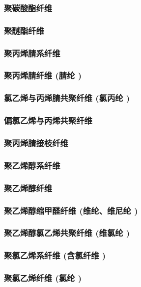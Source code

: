 \documentclass[UTF8]{../../ApplicationUniverse}
\begin{document}
        \subsubsection{聚碳酸酯纤维}
        \subsubsection{聚醚酯纤维}
    \subsubsection{聚丙烯腈系纤维}
        \subsubsection{聚丙烯腈纤维 (腈纶 )}
        \subsubsection{氯乙烯与丙烯腈共聚纤维 (氯丙纶 )}
        \subsubsection{偏氯乙烯与丙烯共聚纤维}
        \subsubsection{聚丙烯腈接枝纤维}
    \subsubsection{聚乙烯醇系纤维}
        \subsubsection{聚乙烯醇纤维}
        \subsubsection{聚乙烯醇缩甲醛纤维 (维纶、维尼纶 )}
        \subsubsection{聚乙烯醇氯乙烯共聚纤维 (维氯纶 )}
    \subsubsection{聚氯乙烯系纤维 (含氯纤维 )}
        \subsubsection{聚氯乙烯纤维 (氯纶 )}
\end{document}
